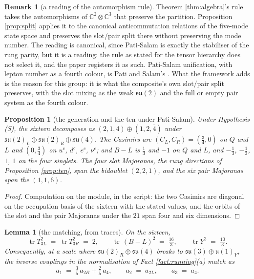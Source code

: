 \documentclass[11pt]{article}
\newtheorem{proposition}[theorem]{Proposition}
\newtheorem{lemma}[theorem]{Lemma}
\theoremstyle{definition}
\newtheorem{remark}[theorem]{Remark}
\newcommand{\C}{\mathbb{C}}
\newcommand{\tr}{\operatorname{tr}}
\newcommand{\su}{\mathfrak{su}}
\newcommand{\uu}{\mathfrak{u}}
\begin{document}
\begin{remark}[a reading of the automorphism rule]\label{rem:splitreading}
Theorem \ref{thm:algebra}'s rule takes the automorphisms of $\C^{2} \otimes \C^{3}$ that preserve the partition. Proposition \ref{prop:split} applies it to the canonical anticommutation relations of the five-mode state space and preserves the slot/pair split there without preserving the mode number. The reading is canonical, since Pati-Salam is exactly the stabiliser of the rung parity, but it is a reading: the rule as stated for the tensor hierarchy does not select it, and the paper registers it as such. Pati-Salam unification, with lepton number as a fourth colour, is Pati and Salam's \cite{PatiSalam1974}. What the framework adds is the reason for this group: it is what the composite's own slot/pair split preserves, with the slot mixing as the weak $\su(2)$ and the full or empty pair system as the fourth colour.
\end{remark}

\begin{proposition}[the generation and the ten under Pati-Salam]\label{prop:pscontent}
Under Hypothesis (S), the sixteen decomposes as $(2,1,4) \oplus (1,2,\bar{4})$ under $\su(2)_{L} \oplus \su(2)_{R} \oplus \su(4)$. The Casimirs are $(C_{L}, C_{R}) = (\tfrac34, 0)$ on $Q$ and $L$ and $(0, \tfrac34)$ on $u^{c}$, $d^{c}$, $e^{c}$, $\nu^{c}$; and $B - L$ is $\tfrac13$ and $-1$ on $Q$ and $L$, and $-\tfrac13$, $-\tfrac13$, $1$, $1$ on the four singlets. The four slot Majoranas, the rung directions of Proposition \ref{prop:ten}, span the bidoublet $(2,2,1)$, and the six pair Majoranas span the $(1,1,6)$.
\end{proposition}

\begin{proof}
Computation on the module, in the script: the two Casimirs are diagonal on the occupation basis of the sixteen with the stated values, and the orbits of the slot and the pair Majoranas under the $21$ span four and six dimensions.
\end{proof}

\begin{lemma}[the matching, from traces]\label{lem:matching}
On the sixteen,
\[
\tr T_{3L}^{2} \;=\; \tr T_{3R}^{2} \;=\; 2, \qquad \tr\,(B - L)^{2} \;=\; \tfrac{16}{3}, \qquad \tr Y^{2} \;=\; \tfrac{10}{3}.
\]
Consequently, at a scale where $\su(2)_{R} \oplus \su(4)$ breaks to $\su(3) \oplus \uu(1)_{Y}$, the inverse couplings in the normalisation of Fact \ref{fact:running}(a) match as
\[
a_{1} \;=\; \tfrac35\, a_{2R} + \tfrac25\, a_{4}, \qquad a_{2} \;=\; a_{2L}, \qquad a_{3} \;=\; a_{4}.
\]
\end{lemma}
\end{document}
